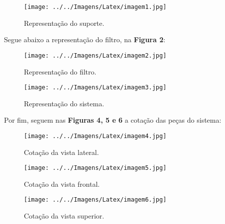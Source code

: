 \documentclass[
	12pt,				%
	oneside,			%
	a4paper,			%
	english,			%
	french,				%
	spanish,			%
	brazil,				%
	]{abntex2}
\begin{document}
\begin{figure}[H]
\center
\caption{Representação do suporte.}
\texttt{[image: ../../Imagens/Latex/imagem1.jpg]} 

\end{figure}

Segue abaixo a representação do filtro, na \textbf{Figura 2}:

\begin{figure}[H]
\center
\caption{Representação do filtro.}
\texttt{[image: ../../Imagens/Latex/imagem2.jpg]}  

\end{figure}

\begin{figure}[H]
\center
\caption{Representação do sistema.}
\texttt{[image: ../../Imagens/Latex/imagem3.jpg]} 

\end{figure}

Por fim, seguem nas \textbf{Figuras 4, 5 e 6} a cotação das peças do sistema:

\begin{figure}[H]
\center
\caption{Cotação da vista lateral.}
\texttt{[image: ../../Imagens/Latex/imagem4.jpg]} 

\end{figure}

\begin{figure}[H]
\center
\caption{Cotação da vista frontal.}
\texttt{[image: ../../Imagens/Latex/imagem5.jpg]} 

\end{figure}

\begin{figure}[H]
\center
\caption{Cotação da vista superior.}
\texttt{[image: ../../Imagens/Latex/imagem6.jpg]} 

\end{figure}




\end{document}
